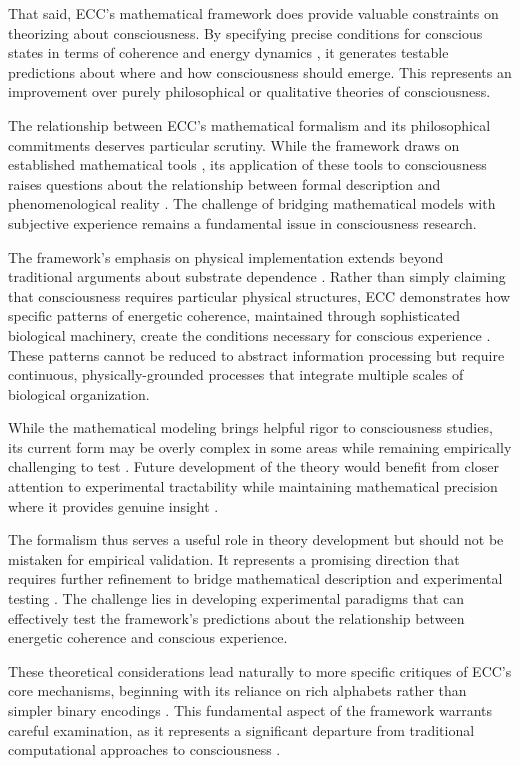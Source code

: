 \begin{refsection}
That said, ECC's mathematical framework does provide valuable constraints on theorizing about consciousness. By specifying precise conditions for conscious states in terms of coherence and energy dynamics \cite{merleau2012phenomenology}, it generates testable predictions about where and how consciousness should emerge. This represents an improvement over purely philosophical or qualitative theories of consciousness.

The relationship between ECC's mathematical formalism and its philosophical commitments deserves particular scrutiny. While the framework draws on established mathematical tools \cite{pigliucci2013philosophy}, its application of these tools to consciousness raises questions about the relationship between formal description and phenomenological reality \cite{block2009comparing}. The challenge of bridging mathematical models with subjective experience remains a fundamental issue in consciousness research.

The framework's emphasis on physical implementation extends beyond traditional arguments about substrate dependence \cite{noe2009out}. Rather than simply claiming that consciousness requires particular physical structures, ECC demonstrates how specific patterns of energetic coherence, maintained through sophisticated biological machinery, create the conditions necessary for conscious experience \cite{koch2019feeling}. These patterns cannot be reduced to abstract information processing but require continuous, physically-grounded processes that integrate multiple scales of biological organization.

While the mathematical modeling brings helpful rigor to consciousness studies, its current form may be overly complex in some areas while remaining empirically challenging to test \cite{chalmers2010character}. Future development of the theory would benefit from closer attention to experimental tractability while maintaining mathematical precision where it provides genuine insight \cite{seth2021being}.

The formalism thus serves a useful role in theory development but should not be mistaken for empirical validation. It represents a promising direction that requires further refinement to bridge mathematical description and experimental testing \cite{goff2019galileo}. The challenge lies in developing experimental paradigms that can effectively test the framework's predictions about the relationship between energetic coherence and conscious experience.

These theoretical considerations lead naturally to more specific critiques of ECC's core mechanisms, beginning with its reliance on rich alphabets rather than simpler binary encodings \cite{thompson2014waking}. This fundamental aspect of the framework warrants careful examination, as it represents a significant departure from traditional computational approaches to consciousness \cite{dennett2017bacteria}.


\end{refsection}
